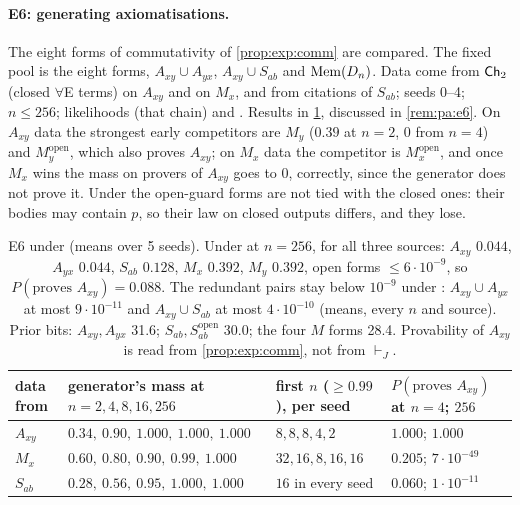 \paragraph{E6: generating axiomatisations.} The eight forms of commutativity of \cref{prop:exp:comm} are compared. The fixed pool is the eight forms, $A_{xy}\cup A_{yx}$, $A_{xy}\cup S_{ab}$ and $\mathrm{Mem}(D_n)$. Data come from $\mathsf{Ch}_{2}$ (closed $\forall$E terms) on $A_{xy}$ and on $M_x$, and from \Lzero{} citations of $S_{ab}$; seeds 0--4; $n\le256$; likelihoods \Lone{} (that chain) and \Lselc. Results in \cref{tab:exp:e6}, discussed in \cref{rem:pa:e6}. On $A_{xy}$ data the strongest early competitors are $M_y$ ($0.39$ at $n=2$, $0$ from $n=4$) and $M_y^{\mathrm{open}}$, which also proves $A_{xy}$; on $M_x$ data the competitor is $M_x^{\mathrm{open}}$, and once $M_x$ wins the mass on provers of $A_{xy}$ goes to $0$, correctly, since the generator does not prove it. Under \Lselc{} the open-guard forms are not tied with the closed ones: their bodies may contain $p$, so their law on closed outputs differs, and they lose.

\begin{table}[ht]
\centering\footnotesize
\begin{tabular}{@{}llll@{}}
\toprule
data from & generator's mass at $n=2,4,8,16,256$ & first $n$ ($\ge0.99$), per seed & $P(\text{proves }A_{xy})$ at $n=4$; $256$\\
\midrule
$A_{xy}$ & $0.34,\ 0.90,\ 1.000,\ 1.000,\ 1.000$ & $8,8,8,4,2$ & $1.000$; $1.000$\\
$M_x$ & $0.60,\ 0.80,\ 0.90,\ 0.99,\ 1.000$ & $32,16,8,16,16$ & $0.205$; $7\cdot10^{-49}$\\
$S_{ab}$ & $0.28,\ 0.56,\ 0.95,\ 1.000,\ 1.000$ & $16$ in every seed & $0.060$; $1\cdot10^{-11}$\\
\bottomrule
\end{tabular}
\caption{E6 under \Lone{} (means over 5 seeds). Under \Lselc{} at $n=256$, for all three sources: $A_{xy}$ $0.044$, $A_{yx}$ $0.044$, $S_{ab}$ $0.128$, $M_x$ $0.392$, $M_y$ $0.392$, open forms $\le6\cdot10^{-9}$, so $P(\text{proves }A_{xy})=0.088$. The redundant pairs stay below $10^{-9}$ under \Lone: $A_{xy}\cup A_{yx}$ at most $9\cdot10^{-11}$ and $A_{xy}\cup S_{ab}$ at most $4\cdot10^{-10}$ (means, every $n$ and source). Prior bits: $A_{xy},A_{yx}$ 31.6; $S_{ab},S_{ab}^{\mathrm{open}}$ 30.0; the four $M$ forms 28.4. Provability of $A_{xy}$ is read from \cref{prop:exp:comm}, not from $\vdash_J$.}
\label{tab:exp:e6}
\end{table}

